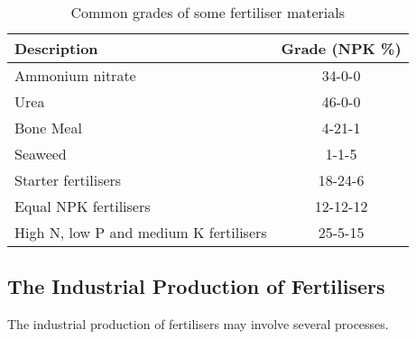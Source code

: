 \begin{table}[h]
\begin{center}
\caption{Common grades of some fertiliser materials}

\begin{tabular}{|l|c|}\hline
\textbf{Description} & \textbf{Grade (NPK \%)} \\\hline\hline
Ammonium nitrate & 34-0-0\\\hline
Urea & 46-0-0\\\hline
Bone Meal & 4-21-1\\\hline
Seaweed & 1-1-5\\\hline
Starter fertilisers & 18-24-6\\\hline
Equal NPK fertilisers & 12-12-12\\\hline
High N, low P and medium K fertilisers & 25-5-15\\\hline
\end{tabular}
\end{center}
\end{table}

\subsection{The Industrial Production of Fertilisers}
\label{sec:fertilisers:industrial}

The industrial production of fertilisers may involve several processes.\\
 
